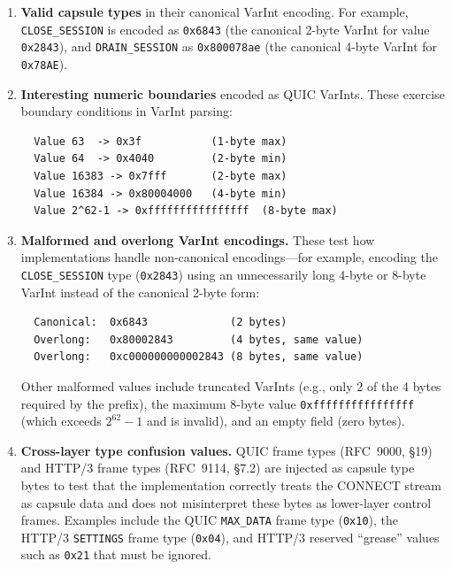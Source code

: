 \begin{enumerate}
    \item \textbf{Valid capsule types} in their canonical VarInt encoding. For example, \texttt{CLOSE\-\_SESSION} is encoded as \texttt{0x6843} (the canonical 2-byte VarInt for value \texttt{0x2843}), and \texttt{DRAIN\-\_SESSION} as \texttt{0x800078ae} (the canonical 4-byte VarInt for \texttt{0x78AE}).

    \item \textbf{Interesting numeric boundaries} encoded as QUIC VarInts. These exercise boundary conditions in VarInt parsing:

\begin{verbatim}
  Value 63  -> 0x3f           (1-byte max)
  Value 64  -> 0x4040         (2-byte min)
  Value 16383 -> 0x7fff       (2-byte max)
  Value 16384 -> 0x80004000   (4-byte min)
  Value 2^62-1 -> 0xffffffffffffffff  (8-byte max)
\end{verbatim}

    \item \textbf{Malformed and overlong VarInt encodings.} These test how implementations handle non-canonical encodings---for example, encoding the \texttt{CLOSE\_SESSION} type (\texttt{0x2843}) using an unnecessarily long 4-byte or 8-byte VarInt instead of the canonical 2-byte form:

\begin{verbatim}
  Canonical:  0x6843             (2 bytes)
  Overlong:   0x80002843         (4 bytes, same value)
  Overlong:   0xc000000000002843 (8 bytes, same value)
\end{verbatim}

    Other malformed values include truncated VarInts (e.g., only 2 of the 4 bytes required by the prefix), the maximum 8-byte value \texttt{0xffffffffffffffff} (which exceeds $2^{62}-1$ and is invalid), and an empty field (zero bytes).

    \item \textbf{Cross-layer type confusion values.} QUIC frame types (RFC~9000, \S19) and HTTP/3 frame types (RFC~9114, \S7.2) are injected as capsule type bytes to test that the implementation correctly treats the CONNECT stream as capsule data and does not misinterpret these bytes as lower-layer control frames. Examples include the QUIC \texttt{MAX\_DATA} frame type (\texttt{0x10}), the HTTP/3 \texttt{SETTINGS} frame type (\texttt{0x04}), and HTTP/3 reserved ``grease'' values such as \texttt{0x21} that must be ignored.
\end{enumerate}

